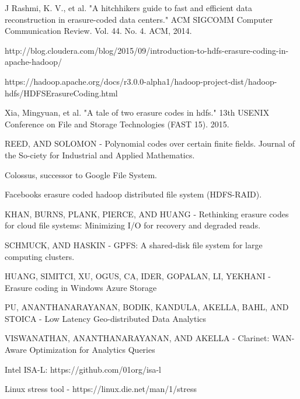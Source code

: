 \documentclass{sig-alternate-05-2015}
\begin{document}



  \begin{thebibliography}{1}

   J Rashmi, K. V., et al. "A hitchhiker\textquotesingle s guide to fast and efficient data reconstruction in erasure-coded data centers." ACM SIGCOMM Computer Communication Review. Vol. 44. No. 4. ACM, 2014.

    http://blog.cloudera.com/blog/2015/09/introduction-to-hdfs-erasure-coding-in-apache-hadoop/
  
   https://hadoop.apache.org/docs/r3.0.0-alpha1/hadoop-project-dist/hadoop-hdfs/HDFSErasureCoding.html

  Xia, Mingyuan, et al. "A tale of two erasure codes in hdfs." 13th USENIX Conference on File and Storage Technologies (FAST 15). 2015.
  
   REED, AND SOLOMON - Polynomial codes over certain finite fields. Journal of the So-ciety for Industrial and Applied Mathematics.
  
   Colossus, successor to Google File System.
  
   Facebook\textquotesingle s erasure coded hadoop distributed file system (HDFS-RAID). 
  
   KHAN, BURNS, PLANK, PIERCE, AND HUANG - Rethinking erasure codes for
cloud file systems: Minimizing I/O for recovery and degraded reads.

   SCHMUCK, AND HASKIN - GPFS: A shared-disk file system for large computing clusters. 
  
   HUANG, SIMITCI, XU, OGUS, CA, IDER, GOPALAN, LI, YEKHANI - Erasure coding in Windows Azure Storage
  
   PU, ANANTHANARAYANAN, BODIK, KANDULA, AKELLA, BAHL, AND STOICA - Low Latency Geo-distributed Data Analytics
  
   VISWANATHAN, ANANTHANARAYANAN, AND AKELLA - Clarinet: WAN-Aware Optimization for Analytics Queries
  
   Intel ISA-L: https://github.com/01org/isa-l
  
   Linux stress tool - https://linux.die.net/man/1/stress
  

  \end{thebibliography}
\end{document}
